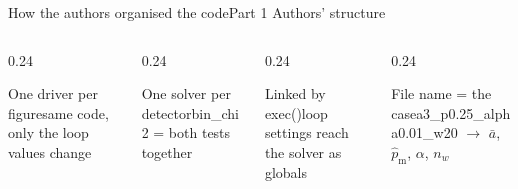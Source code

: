 \documentclass[9pt,aspectratio=169]{beamer}
\newcommand{\abar}{\ensuremath{\bar a}}
\newcommand{\phatm}{\ensuremath{\hat p_{\mathrm m}}}
\newcommand{\code}[1]{{\ttfamily #1}}
\begin{document}
\begin{frame}{How the authors organised the code}{Part 1 \textperiodcentered{} Authors' structure}
\vspace{-0.1cm}
\begin{columns}[T,onlytextwidth]
\begin{column}{0.24\textwidth}\begin{block}{One driver per figure}same code, only the loop values change\end{block}\end{column}
\begin{column}{0.24\textwidth}\begin{block}{One solver per detector}\code{bin\_chi2} = both tests together\end{block}\end{column}
\begin{column}{0.24\textwidth}\begin{block}{Linked by exec()}loop settings reach the solver as globals\end{block}\end{column}
\begin{column}{0.24\textwidth}\begin{block}{File name = the case}\code{a3\_p0.25\_alpha0.01\_w20} $\to$ \abar, \phatm, $\alpha$, $n_w$\end{block}\end{column}
\end{columns}
\end{frame}
\end{document}
